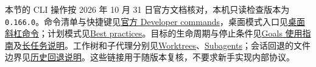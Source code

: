 \begin{note}
本节的 CLI 操作按 2026 年 10 月 31 日官方文档核对，本机只读检查版本为 \texttt{0.166.0}。命令清单与快捷键见\href{https://learn.chatgpt.com/docs/developer-commands}{官方 Developer commands}，桌面模式入口见\href{https://learn.chatgpt.com/docs/reference/slash-commands}{桌面斜杠命令}；计划模式见\href{https://learn.chatgpt.com/guides/best-practices}{Best practices}。目标的生命周期与停止条件见\href{https://developers.openai.com/cookbook/examples/codex/using_goals_in_codex}{Goals 使用指南}及\href{https://learn.chatgpt.com/docs/long-running-work}{长任务说明}。工作树和子代理分别见\href{https://learn.chatgpt.com/docs/environments/git-worktrees}{Worktrees}、\href{https://learn.chatgpt.com/docs/agent-configuration/subagents}{Subagents}；会话回退的文件边界见\href{https://learn.chatgpt.com/docs/app-server\#revert-thread-history}{历史回退说明}。这些链接用于随版本复核，不要求新手实现内部协议。
\end{note}
